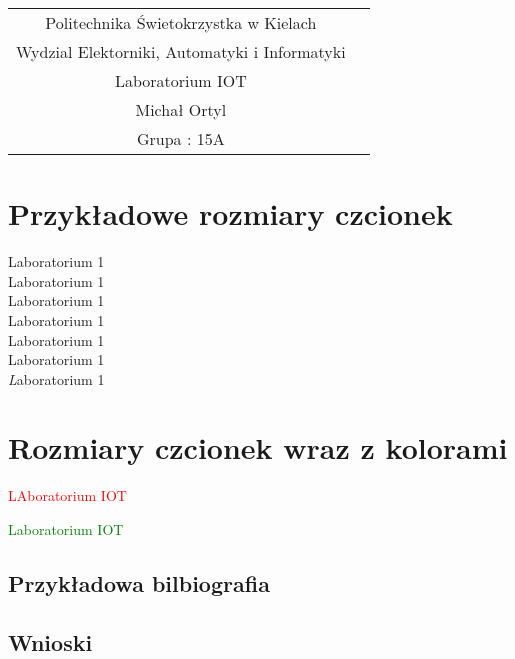 \documentclass[10pt,a4paper]{article}
\begin{document}
\setlength{\headheight}{10pt}

\begin{center}
\begin{tabular}{|c||c|} \hline


Politechnika Świetokrzystka w Kielach\\
Wydzial Elektorniki, Automatyki i Informatyki\\
\hline 
Laboratorium IOT \\
\hline 
Michał Ortyl \\ 
\hline 
Grupa : 15A \\
\hline
\end{tabular}

\section{Przykładowe rozmiary czcionek}
{\tiny Laboratorium 1 \\}
{\small Laboratorium 1 \\}
{\normalsize Laboratorium 1 \\}
{\large Laboratorium 1 \\}
{\huge Laboratorium 1 \\}
{\Huge Laboratorium 1 \\}
{\textit Laboratorium 1 \\}

\section{Rozmiary czcionek wraz z kolorami}
\begin{Large}
\textcolor{red}{LAboratorium IOT}\\
\end{Large}

\begin{huge}
\textcolor{green}{Laboratorium IOT}\\
\end{huge}
\end{center}
\begin{center}
\section{Przykładowa bilbiografia}
\end{center}
\cite{haken:atomy:kwanty}



\newpage
\begin{center}
\section{Wnioski}
\end{center}
\end{document}
